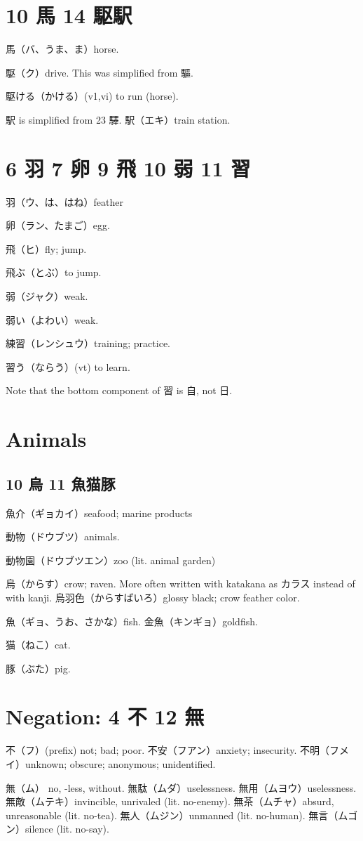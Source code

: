 \section{10 馬 14 駆駅}

馬（バ、うま、ま）horse.

駆（ク）drive.
This was simplified from 驅.

駆ける（かける）(v1,vi) to run (horse).

駅 is simplified from 23 驛.
駅（エキ）train station.

\section{6 羽 7 卵 9 飛 10 弱 11 習}

羽（ウ、は、はね）feather

卵（ラン、たまご）egg.

飛（ヒ）fly; jump.

飛ぶ（とぶ）to jump.

弱（ジャク）weak.

弱い（よわい）weak.

練習（レンシュウ）training; practice.

習う（ならう）(vt) to learn.

Note that the bottom component of 習 is 自, not 日.

\section{Animals}

\subsection{10 烏 11 魚猫豚}

魚介（ギョカイ）seafood; marine products

動物（ドウブツ）animals.

動物園（ドウブツエン）zoo (lit. animal garden)

烏（からす）crow; raven.
More often written with katakana as カラス instead of with kanji.
烏羽色（からすばいろ）glossy black; crow feather color.

魚（ギョ、うお、さかな）fish.
金魚（キンギョ）goldfish.

猫（ねこ）cat.

豚（ぶた）pig.

\section{Negation: 4 不 12 無}

不（フ）(prefix) not; bad; poor.
不安（フアン）anxiety; insecurity.
不明（フメイ）unknown; obscure; anonymous; unidentified.

無（ム） no, -less, without.
無駄（ムダ）uselessness.
無用（ムヨウ）uselessness.
無敵（ムテキ）invincible, unrivaled (lit. no-enemy).
無茶（ムチャ）absurd, unreasonable (lit. no-tea).
無人（ムジン）unmanned (lit. no-human).
無言（ムゴン）silence (lit. no-say).
